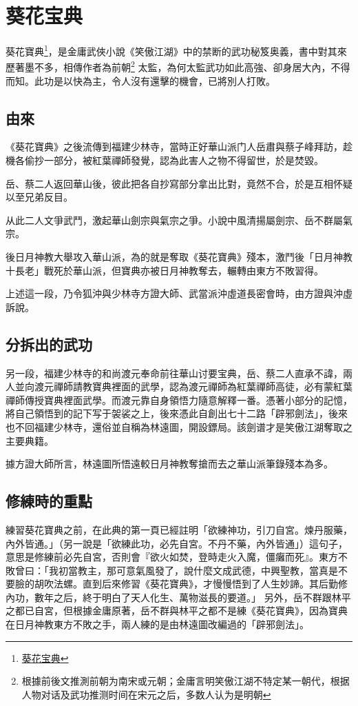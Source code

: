 \chapter{葵花宝典}
葵花寶典\footnote{\href{http://zh.wikipedia.org/wiki/\%E8\%91\%B5\%E8\%8A\%B1\%E5\%AE\%9D\%E5\%85\%B8}{葵花宝典}}，是金庸武俠小說《笑傲江湖》中的禁断的武功秘笈奥義，書中對其來歷著墨不多，相傳作者為前朝\footnote{根據前後文推測前朝为南宋或元朝；金庸言明笑傲江湖不特定某一朝代，根据人物对话及武功推测时间在宋元之后，多数人认为是明朝}
太監，為何太監武功如此高強、卻身居大內，不得而知。此功是以快為主，令人沒有還擊的機會，已將別人打敗\cite{khbd}。

\section{由來}

《葵花寶典》之後流傳到福建少林寺，當時正好華山派门人岳肅與蔡子峰拜訪，趁機各偷抄一部分，被紅葉禪師發覺，認為此害人之物不得留世，於是焚毀。

岳、蔡二人返回華山後，彼此把各自抄寫部分拿出比對，竟然不合，於是互相怀疑以至兄弟反目。

从此二人文爭武鬥，激起華山劍宗與氣宗之爭。小說中風清揚屬劍宗、岳不群屬氣宗。

後日月神教大舉攻入華山派，為的就是奪取《葵花寶典》殘本，激鬥後「日月神教十長老」戰死於華山派，但寶典亦被日月神教奪去，輾轉由東方不敗習得。

上述這一段，乃令狐沖與少林寺方證大師、武當派沖虛道長密會時，由方證與沖虛訴說。

\section{分拆出的武功}

另一段，福建少林寺的和尚渡元奉命前往華山讨要宝典，岳、蔡二人直承不諱，兩人並向渡元禪師請教寶典裡面的武學，認為渡元禪師為紅葉禪師高徒，必有蒙紅葉禪師傳授寶典裡面武學。而渡元靠自身領悟力隨意解釋一番。憑著小部分的記憶，將自己領悟到的記下写于袈裟之上，後來憑此自創出七十二路「辟邪劍法」，後來也不回福建少林寺，還俗並自稱為林遠圖，開設鏢局。該劍谱才是笑傲江湖奪取之主要典籍。

據方證大師所言，林遠圖所悟遠較日月神教奪搶而去之華山派筆錄殘本為多。

\section{修練時的重點}

練習葵花寶典之前，在此典的第一頁已經註明「欲練神功，引刀自宮。煉丹服藥，內外皆通。」（另一說是「欲練此功，必先自宮。不丹不藥，內外皆通」）這句子，意思是修練前必先自宮，否則會『欲火如焚，登時走火入魔，僵癱而死』。東方不敗曾曰：「我初當教主，那可意氣風發了，說什麼文成武德，中興聖教，當真是不要臉的胡吹法螺。直到后來修習《葵花寶典》，才慢慢悟到了人生妙諦。其后勤修內功，數年之后，終于明白了天人化生、萬物滋長的要道。」
另外，岳不群跟林平之都已自宮，但根據金庸原著，岳不群與林平之都不是練《葵花寶典》，因為寶典在日月神教東方不敗之手，兩人練的是由林遠圖改編過的「辟邪劍法」。

